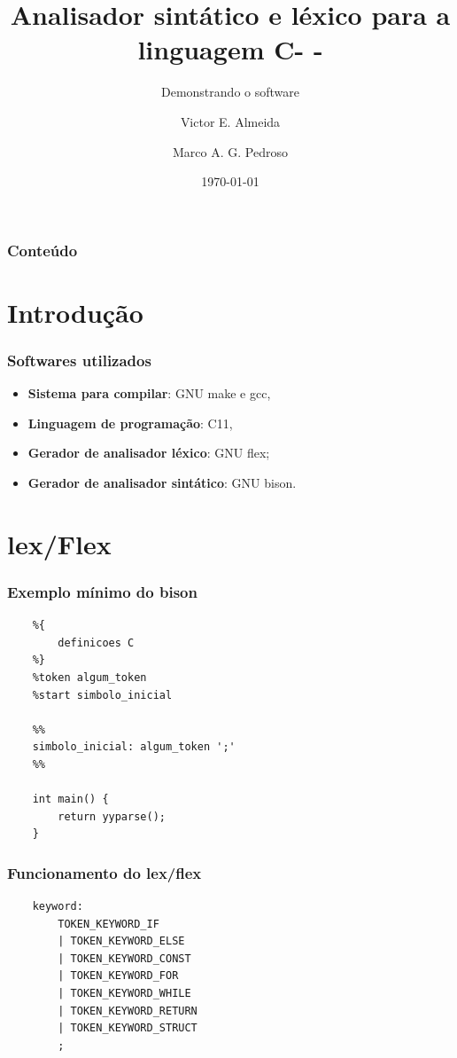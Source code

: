 \documentclass[12pt]{beamer}
\author[Grupo: c--]{Victor E. Almeida \and Marco A. G. Pedroso}
\title{Analisador sintático e léxico para a linguagem C- -}
\subtitle{Demonstrando o software}
\date{\today}
\institute{UNIOESTE}
\begin{document}
\frame{\titlepage}

\begin{frame}
\frametitle{Conteúdo}
\tableofcontents
\end{frame}

\section{Introdução}\label{Introdução}
\begin{frame}
    \frametitle{Softwares utilizados}
    \begin{itemize}
        \item \textbf{Sistema para compilar}: GNU make e gcc,
        \item \textbf{Linguagem de programação}: C11,
        \item \textbf{Gerador de analisador léxico}: GNU flex;
        \item \textbf{Gerador de analisador sintático}: GNU bison.
    \end{itemize}
\end{frame}

\begin{frame}
    \frametitle{}
\end{frame}

\section{lex/Flex}\label{lex/Flex}

\begin{frame}[t,fragile]{\insertsectionhead}
    \frametitle{Exemplo mínimo do bison}
    \begin{lstlisting}
    %{
        definicoes C
    %}
    %token algum_token
    %start simbolo_inicial

    %%
    simbolo_inicial: algum_token ';'
    %%

    int main() {
        return yyparse();
    }
    \end{lstlisting}
\end{frame}

\begin{frame}[t,fragile]{\insertsectionhead}
    \frametitle{Funcionamento do lex/flex}

    \begin{center}
        
    \begin{lstlisting}
    keyword:
	    TOKEN_KEYWORD_IF
	    | TOKEN_KEYWORD_ELSE
	    | TOKEN_KEYWORD_CONST
	    | TOKEN_KEYWORD_FOR
	    | TOKEN_KEYWORD_WHILE
	    | TOKEN_KEYWORD_RETURN
	    | TOKEN_KEYWORD_STRUCT
	    ;
    \end{lstlisting}
    \end{center}
    
\end{frame}
\end{document}
